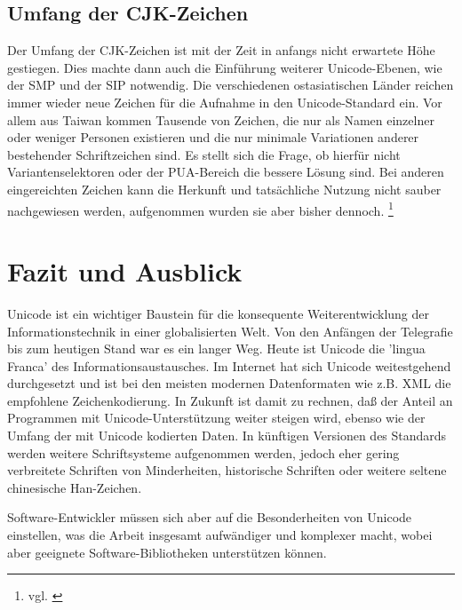 \subsection{Umfang der CJK-Zeichen}
Der Umfang der CJK-Zeichen ist mit der Zeit in anfangs nicht erwartete Höhe gestiegen. Dies machte dann auch die Einführung weiterer Unicode-Ebenen, wie der SMP und der SIP notwendig.
Die verschiedenen ostasiatischen Länder reichen immer wieder neue Zeichen für die Aufnahme in den Unicode-Standard ein. Vor allem aus Taiwan kommen Tausende von Zeichen, die nur als Namen einzelner oder weniger Personen existieren und die nur minimale Variationen anderer bestehender Schriftzeichen sind. Es stellt sich die Frage, ob hierfür nicht Variantenselektoren oder der PUA-Bereich die bessere Lösung sind. Bei anderen eingereichten Zeichen kann die Herkunft und tatsächliche Nutzung nicht sauber nachgewiesen werden, aufgenommen wurden sie aber bisher dennoch.  \footnote{vgl. \cite{West2007}}

\section{Fazit und Ausblick}
Unicode ist ein wichtiger Baustein für die konsequente Weiterentwicklung der Informationstechnik in einer globalisierten Welt. Von den Anfängen der Telegrafie bis zum heutigen Stand war es ein langer Weg. Heute ist Unicode die 'lingua Franca' des Informationsaustausches. Im Internet hat sich Unicode weitestgehend durchgesetzt und ist bei den meisten modernen Datenformaten wie z.B. XML die empfohlene Zeichenkodierung. In Zukunft ist damit zu rechnen, daß der Anteil an Programmen mit Unicode-Unterstützung weiter steigen wird, ebenso wie der Umfang der mit Unicode kodierten Daten. In künftigen Versionen des Standards werden weitere Schriftsysteme aufgenommen werden, jedoch eher gering verbreitete Schriften von Minderheiten, historische Schriften oder weitere seltene chinesische Han-Zeichen. 

Software-Entwickler müssen sich aber auf die Besonderheiten von Unicode einstellen, was die Arbeit insgesamt aufwändiger und komplexer macht, wobei aber geeignete Software-Bibliotheken unterstützen können.
